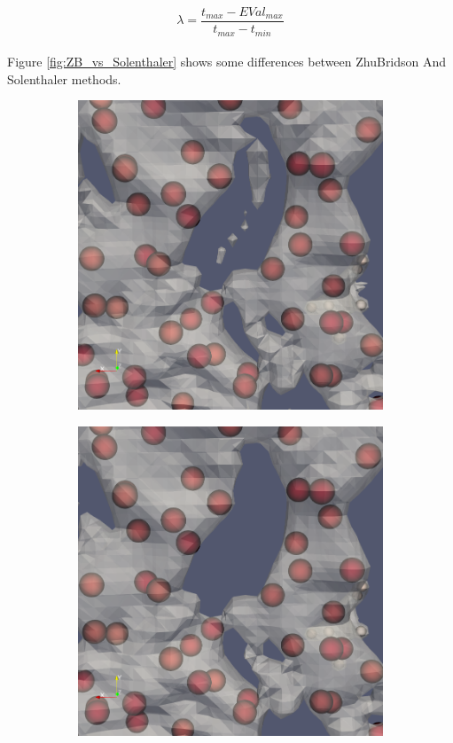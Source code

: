 \begin{equation}
	\lambda = \dfrac{t_{max} - EVal_{max}}{t_{max} - t_{min}}
\end{equation}\\
Figure \ref{fig:ZB_vs_Solenthaler} shows some differences between ZhuBridson And Solenthaler methods.
\begin{figure}[H]
	\begin{center}
		\begin{subfigure}[b]{0.45\textwidth}
			\includegraphics[width=\textwidth]{figures/GhostSurfaceZhuBridson.png}
		\end{subfigure}
		\begin{subfigure}[b]{0.45\textwidth}
			\includegraphics[width=\textwidth]{figures/GhostSurfaceSolenthaler.png}

\end{subfigure}
\end{center}
\end{figure}
